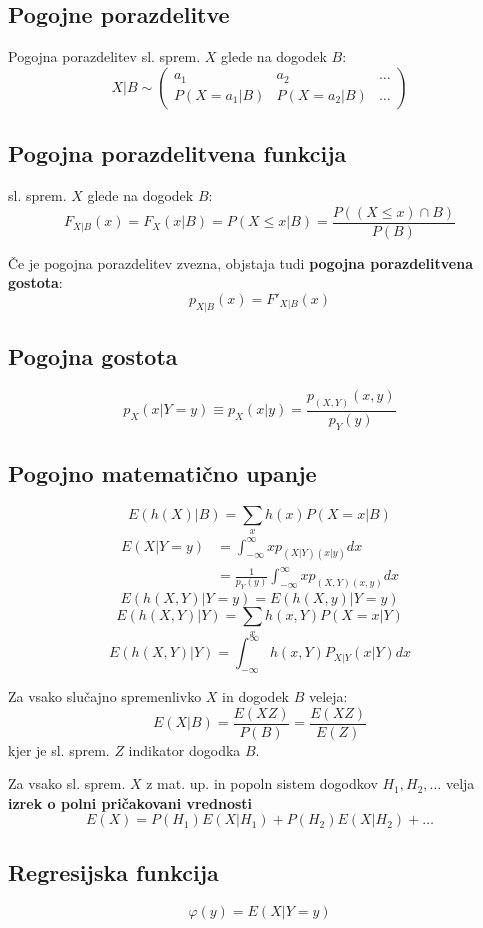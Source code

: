 \begin{multicols}{5}
\section{Pogojne porazdelitve}
Pogojna porazdelitev sl. sprem. $X$ glede na dogodek $B$:
\[ X|B \sim \left( \begin{matrix}
    a_1 & a_2 &\dots \\
    P(X = a_1 | B) & P(X = a_2 | B) &\dots 
\end{matrix}\right)\]

\subsection{Pogojna porazdelitvena funkcija}
sl. sprem. $X$ glede na dogodek $B$:
\[ F_{X|B}(x) = F_X(x|B) = P(X \leq x | B) = \frac{P((X\leq x) \cap B)}{P(B)} \]

Če je pogojna porazdelitev zvezna, objstaja tudi \textbf{pogojna porazdelitvena gostota}:
\[ p_{X|B}(x) = F'_{X|B}(x)\]

\subsection{Pogojna gostota}
\[p_X(x|Y=y) \equiv p_X(x|y) = \frac{p_{(X,Y)}(x,y)}{p_Y(y)}\]

\subsection{Pogojno matematično upanje}
\[ E(h(X) | B) = \sum_x h(x) P(X = x | B)\]
\begin{align*}
    E(X|Y=y) &= \int_{-\infty}^\infty x p_{(X|Y)(x|y)} dx \\
    &= \frac{1}{p_Y(y)} \int_{-\infty}^\infty x p_{(X,Y)(x,y)} dx
\end{align*}
\[ E(h(X,Y) |Y=y) = E(h(X,y) | Y=y ) \]
\[ E(h(X,Y) | Y) = \sum_x h(x,Y) P(X=x |Y)\]
\[ E(h(X,Y) | Y) = \int_{-\infty}^{\infty} h(x,Y) P_{X|Y}(x|Y) dx \]

Za vsako slučajno spremenlivko $X$ in dogodek $B$ veleja:
\[ E(X |B) = \frac{E(XZ)}{P(B)} = \frac{E(XZ)}{E(Z)}\]
kjer je sl. sprem. $Z$ indikator dogodka $B$.

Za vsako sl. sprem. $X$ z mat. up. in popoln sistem dogodkov $H_1, H_2, \dots$ velja \textbf{izrek o polni pričakovani vrednosti}
\[E(X) = P(H_1)E(X | H_1) + P(H_2)E(X | H_2)+\dots \]

\subsection{Regresijska funkcija}
\[ \varphi(y) = E(X | Y = y) \]


\end{multicols}
